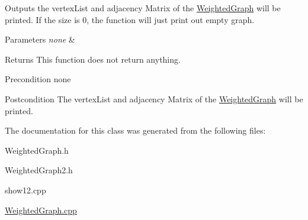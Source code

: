 Outputs the vertex\+List and adjacency Matrix of the \hyperlink{class_weighted_graph}{Weighted\+Graph} will be printed. If the size is 0, the function will just print out empty graph.


\begin{DoxyParams}{Parameters}
{\em none} & \\
\hline
\end{DoxyParams}
\begin{DoxyReturn}{Returns}
This function does not return anything.
\end{DoxyReturn}
\begin{DoxyPrecond}{Precondition}
none 
\end{DoxyPrecond}
\begin{DoxyPostcond}{Postcondition}
The vertex\+List and adjacency Matrix of the \hyperlink{class_weighted_graph}{Weighted\+Graph} will be printed. 
\end{DoxyPostcond}


The documentation for this class was generated from the following files\+:\begin{DoxyCompactItemize}
\item 
Weighted\+Graph.\+h\item 
Weighted\+Graph2.\+h\item 
show12.\+cpp\item 
\hyperlink{_weighted_graph_8cpp}{Weighted\+Graph.\+cpp}\end{DoxyCompactItemize}

